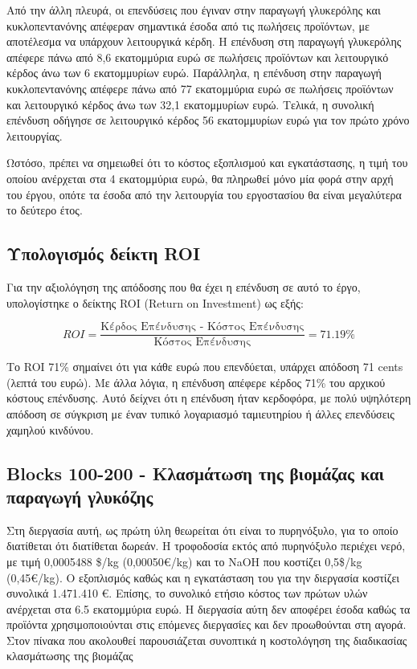 \documentclass[11pt]{article}
\begin{document}
Από την άλλη πλευρά, οι επενδύσεις που έγιναν στην παραγωγή γλυκερόλης
και κυκλοπεντανόνης απέφεραν σημαντικά έσοδα από τις πωλήσεις προϊόντων,
με αποτέλεσμα να υπάρχουν λειτουργικά κέρδη. Η επένδυση στη παραγωγή
γλυκερόλης απέφερε πάνω από 8,6 εκατομμύρια ευρώ σε πωλήσεις προϊόντων
και λειτουργικό κέρδος άνω των 6 εκατομμυρίων ευρώ. Παράλληλα, η
επένδυση στην παραγωγή κυκλοπεντανόνης απέφερε πάνω από 77 εκατομμύρια
ευρώ σε πωλήσεις προϊόντων και λειτουργικό κέρδος άνω των 32,1
εκατομμυρίων ευρώ. Τελικά, η συνολική επένδυση οδήγησε σε λειτουργικό
κέρδος 56 εκατομμυρίων ευρώ για τον πρώτο χρόνο λειτουργίας.

Ωστόσο, πρέπει να σημειωθεί ότι το κόστος εξοπλισμού και εγκατάστασης, η
τιμή του οποίου ανέρχεται στα 4 εκατομμύρια ευρώ, θα πληρωθεί μόνο μία
φορά στην αρχή του έργου, οπότε τα έσοδα από την λειτουργία του
εργοστασίου θα είναι μεγαλύτερα το δεύτερο έτος.

\subsection{Υπολογισμός δείκτη ROI}
\label{sec:org90973ba}
Για την αξιολόγηση της απόδοσης που θα έχει η επένδυση σε αυτό το έργο,
υπολογίστηκε ο δείκτης ROI (Return on Investment) ως εξής:

\[ ROI = \frac{\text{Κέρδος Επένδυσης - Κόστος Επένδυσης}}{\text{Κόστος Επένδυσης}} = 71.19 \% \]

Το ROI 71\% σημαίνει ότι για κάθε ευρώ που επενδύεται, υπάρχει απόδοση 71
cents (λεπτά του ευρώ). Με άλλα λόγια, η επένδυση απέφερε κέρδος 71\% του
αρχικού κόστους επένδυσης. Αυτό δείχνει ότι η επένδυση ήταν κερδοφόρα,
με πολύ υψηλότερη απόδοση σε σύγκριση με έναν τυπικό λογαριασμό
ταμιευτηρίου ή άλλες επενδύσεις χαμηλού κινδύνου.

\subsection{Blocks 100-200 - Κλασμάτωση της βιομάζας και παραγωγή γλυκόζης}
\label{sec:org5250911}
Στη διεργασία αυτή, ως πρώτη ύλη θεωρείται ότι είναι το πυρηνόξυλο, για
το οποίο διατίθεται ότι διατίθεται δωρεάν. Η τροφοδοσία εκτός από
πυρηνόξυλο περιέχει νερό, με τιμή 0,0005488 \$/kg (0,00050€/kg) και το
NaOH που κοστίζει 0,5\$/kg (0,45€/kg). Ο εξοπλισμός καθώς και η
εγκατάσταση του για την διεργασία κοστίζει συνολικά 1.471.410 €. Επίσης,
το συνολικό ετήσιο κόστος των πρώτων υλών ανέρχεται στα 6.5 εκατομμύρια
ευρώ. Η διεργασία αύτη δεν αποφέρει έσοδα καθώς τα προϊόντα
χρησιμοποιούνται στις επόμενες διεργασίες και δεν προωθούνται στη αγορά.
Στον πίνακα που ακολουθεί παρουσιάζεται συνοπτικά η κοστολόγηση της
διαδικασίας κλασμάτωσης της βιομάζας
\end{document}
